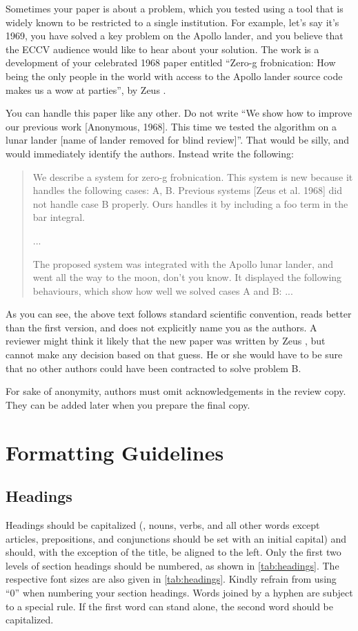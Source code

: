 \documentclass[runningheads]{llncs}
\begin{document}
Sometimes your paper is about a problem, which you tested using a tool that is widely known to be restricted to a single institution.
For example, let's say it's 1969, you have solved a key problem on the Apollo lander, and you believe that the ECCV audience would like to hear about your
solution.
The work is a development of your celebrated 1968 paper entitled ``Zero-g frobnication: How being the only people in the world with access to the Apollo lander source code makes us a wow at parties'', by Zeus \etal.

You can handle this paper like any other.
Do not write ``We show how to improve our previous work [Anonymous, 1968].
This time we tested the algorithm on a lunar lander [name of lander removed for blind review]''.
That would be silly, and would immediately identify the authors.
Instead write the following:
\begin{quotation}
   We describe a system for zero-g frobnication.
   This system is new because it handles the following cases:
   A, B.  Previous systems [Zeus et al. 1968] did not  handle case B properly.
   Ours handles it by including a foo term in the bar integral.

   ...

   The proposed system was integrated with the Apollo lunar lander, and went all the way to the moon, don't you know.
   It displayed the following behaviours, which show how well we solved cases A and B: ...
\end{quotation}
As you can see, the above text follows standard scientific convention, reads better than the first version, and does not explicitly name you as the authors.
A reviewer might think it likely that the new paper was written by Zeus \etal, but cannot make any decision based on that guess.
He or she would have to be sure that no other authors could have been contracted to solve problem B.

For sake of anonymity, authors must omit acknowledgements in the review copy. 
They can be added later when you prepare the final copy.


\section{Formatting Guidelines}

\subsection{Headings}
Headings should be capitalized (\ie, nouns, verbs, and all other words except articles, prepositions, and conjunctions should be set with an initial capital) and should, with the exception of the title, be aligned to the left.
Only the first two levels of section headings should be numbered, as shown in \cref{tab:headings}.
The respective font sizes are also given in \cref{tab:headings}. 
Kindly refrain from using ``0'' when numbering your section headings.
Words joined by a hyphen are subject to a special rule. 
If the first word can stand alone, the second word should be capitalized.
\end{document}
